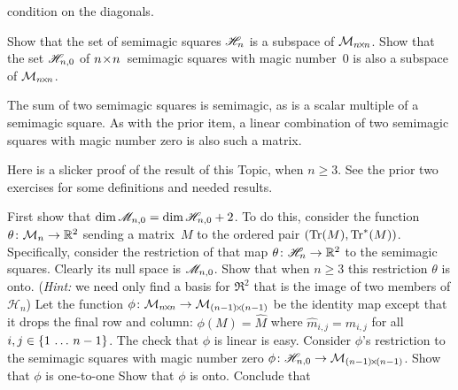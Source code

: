 \begin{exercises}
     condition on the diagonals.
     \begin{exparts*}
       \partsitem
         Show that the set of semimagic squares $\mathscr{H}_n$ 
         is a subspace of $\mathcal{M}_{n \! \times \! n}$.
       \partsitem
         Show that 
         the set $\mathscr{H}_{n,0}$  
         of $n \! \times \! n$~semimagic squares with magic number~$0$
         is also a subspace of $\mathcal{M}_{n \! \times \! n}$.
     \end{exparts*}
     \begin{answer}
       \begin{exparts*}
         \partsitem
           The sum of two semimagic squares is semimagic, as is a scalar 
           multiple of a semimagic square.
         \partsitem
           As with the prior item, a linear combination of two semimagic
           squares with magic number zero is also such a matrix.
       \end{exparts*}
     \end{answer}
  \item 
    \cite{Beardon}
    Here is a slicker proof of the result of this Topic, when $n\geq 3$.
    See the prior two exercises for some definitions and needed results.
    \begin{exparts}
      \partsitem
        First show that 
        $\dim\mathscr{M}_{n,0}=\dim\mathscr{H}_{n,0}+2$.
        To do this, consider the function
        $\mbox{$\theta\colon \mathcal{M}_n\to \mathbb{R}^2$}$ sending a 
        matrix~$M$ to
        the ordered pair $(\operatorname{Tr}(M),\operatorname{Tr}^*(M))$.
        Specifically, consider the restriction of that map
        $\mbox{$\theta\colon \mathscr{H}_n\to \mathbb{R}^2$}$ to the semimagic squares.  
        Clearly its null space is $\mathscr{M}_{n,0}$.
        Show that when $n\geq 3$ this restriction $\theta$ is onto.
        (\textit{Hint:} we need only find a basis for 
           $\Re^2$ that is the
           image of two members of $\mathcal{H}_n$)  
      \partsitem
        Let the function $\mbox{$\phi\colon \mathcal{M}_{n \! \times \! n}\to \mathcal{M}_{(n-1) \! \times \! (n-1)}$}$
        be the identity map except that it 
        drops the final row and column: $\phi(M)=\hat{M}$ where 
        $\hat{m}_{i,j}=m_{i,j}$ for all $i,j\in\mbox{$\{1\,\ldots\, n-1\}$}$.
        The check that $\phi$ is linear is easy.
        Consider $\phi$'s restriction to the semimagic squares with 
        magic number zero
       $\mbox{$\phi\colon \mathscr{H}_{n,0}\to \mathcal{M}_{(n-1) \! \times \! (n-1)}$}$.
       Show that $\phi$ is one-to-one
     \partsitem
       Show that $\phi$ is onto.
     \partsitem Conclude that

\end{exparts}
\end{exercises}

